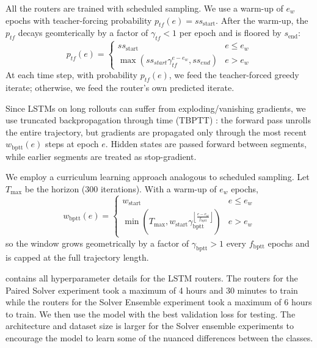 \documentclass{article}
\begin{document}
All the routers are trained with scheduled sampling. We use a warm-up of $e_{w}$ epochs with teacher-forcing probability $p_{tf}(e) = ss_{\text{start}}$. After the warm-up, the $p_{tf}$ decays geomterically by a factor of $\gamma_{tf} < 1$ per epoch and is floored by $s_{\text{end}}$:
\begin{equation*}
    p_{tf}(e) = \begin{cases}
        ss_{\text{start}} & e \leq e_w\\
        \max(ss_{start}\gamma_{tf}^{e - e_{w}}, ss_{end}) & e > e_w
    \end{cases}
\end{equation*}
At each time step, with probability $p_{tf}(e)$, we feed the teacher-forced greedy iterate; otherwise, we feed the router's own predicted iterate.


Since LSTMs on long rollouts can suffer from exploding/vanishing gradients, we use truncated backpropagation through time (TBPTT) \citep{mozer2013focused,robinson1987utility,werbos1988generalization}: the forward pass unrolls the entire trajectory, but gradients are propagated only through the most recent $w_{\text{bptt}}(e)$ steps at epoch $e$. Hidden states are passed forward between segments, while earlier segments are treated as stop-gradient.

We employ a curriculum learning approach analogous to scheduled sampling. Let $T_{\max}$ be the horizon ($300$ iterations). With a warm-up of $e_w$ epochs,
\begin{equation}
    w_{\text{bptt}}(e)  = 
    \begin{cases}
        w_{\text{start}} & e \leq e_w \\
        \min\left(T_{\max}, w_{\text{start}}\gamma_{\text{bptt}}^{\left\lfloor \frac{e - e_w}{f_{\text{bptt}}}\right\rfloor} \right) & e > e_w
    \end{cases}
\end{equation}
so the window grows geometrically by a factor of $\gamma_{\text{bptt}} > 1$ every $f_{\text{bptt}}$ epochs and is capped at the full trajectory length.

 contains all hyperparameter details for the LSTM routers. The routers for the Paired Solver experiment took a maximum of 4 hours and 30 minutes to train while the routers for the Solver Ensemble experiment took a maximum of 6 hours to train. We then use the model with the best validation loss for testing.  The architecture and dataset size is larger for the Solver ensemble experiments to encourage the model to learn some of the nuanced differences between the classes.
\end{document}
